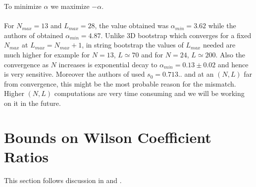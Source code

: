 ﻿\documentclass[12pt,a4paper]{article}
\begin{document}
To minimize $\alpha$ we maximize $-\alpha$.\\\\
For $N_{max}=13$ and $L_{max}=28$, the value obtained was $\alpha_{min}=3.62$ while the authors of \cite{8} obtained $\alpha_{min}=4.87$. Unlike 3D bootstrap which converges for a fixed $N_{max}$ at $L_{max}=N_{max}+1$, in string bootstrap the values of $L_{max}$ needed are much higher for example for $N=13$, $L\simeq 70$ and for $N=24$, $L\simeq 200$. Also the convergence as $N$ increases is exponential decay to $\alpha_{min}=0.13\pm 0.02$ and hence is very sensitive. Moreover the authors of \cite{8} used $s_{0}=0.713..$ and at an $(N,L)$ far from convergence, this might be the most probable reason for the mismatch. Higher $(N,L)$ computations are very time consuming and we will be working on it in the future.
















\section{Bounds on Wilson Coefficient Ratios}
This section follows discussion in \cite{9} and \cite{10}.
\end{document}
